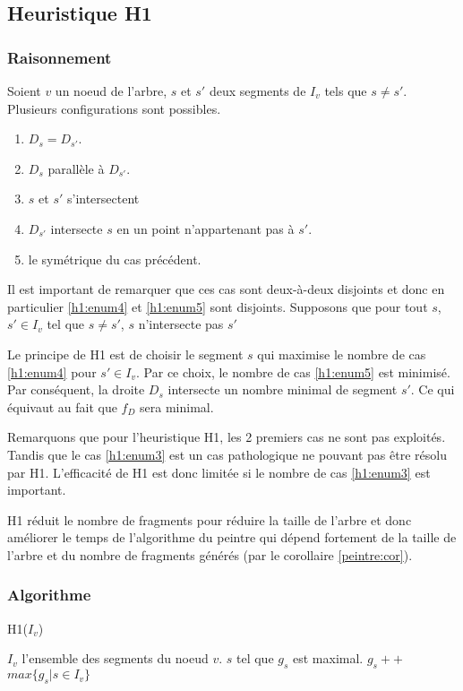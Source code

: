 \subsection{Heuristique H1}
\subsubsection*{Raisonnement}
Soient $v$ un noeud de l'arbre, $s$ et $s'$ deux segments
de $I_v$ tels que $s \ne s'$.
Plusieurs configurations sont possibles.
\begin{enumerate}
\item  $D_s = D_{s'} $. \label{h1:enum1}
\item $D_s$ parallèle à $D_{s'} $. \label{h1:enum2}
\item $s$ et $s'$ s'intersectent \label{h1:enum3}
\item $D_{s'}$ intersecte $s$ en un point n'appartenant pas à $s'$.\label{h1:enum4}
\item le symétrique du cas précédent. \label{h1:enum5}
\end{enumerate}

Il est important de remarquer que ces cas sont deux-à-deux disjoints
et donc en particulier \ref{h1:enum4} et \ref{h1:enum5} sont disjoints.
Supposons que pour tout $s$, $s' \in I_v $ tel que $s \neq s'$,
$s$ n'intersecte pas $s'$

Le principe de H1 est de choisir le segment $s$ qui maximise
le nombre de cas \ref{h1:enum4} pour $s' \in I_v$.
Par ce choix, le nombre de cas \ref{h1:enum5} est minimisé.
Par conséquent, la droite $D_s$ intersecte un nombre minimal de segment $s'$.
Ce qui équivaut au fait que $f_D$ sera minimal.


Remarquons que pour l'heuristique H1, les 2 premiers cas ne sont pas exploités.
Tandis que le cas \ref{h1:enum3} est un cas pathologique ne pouvant pas
être résolu par H1.
L'efficacité de H1 est donc limitée si le nombre de cas
\ref{h1:enum3} est important.

H1 réduit le nombre de fragments pour réduire la taille de l'arbre
et donc améliorer le temps de l'algorithme du peintre qui dépend
fortement de la taille de l'arbre et du nombre de fragments générés (par
le corollaire \ref{peintre:cor}).

\subsubsection*{Algorithme}
\begin{algorithm}
  \caption{H1($I_v$)}
  \begin{algorithmic}[1] \label{algo:propvis}
    \REQUIRE $I_v$ l'ensemble des segments du noeud $v$.
    \ENSURE $s$ tel que $g_s$ est maximal.
    \STATE $g_s++$
    \ENDIF
    \ENDFOR
    \ENDFOR
    \RETURN $max\{g_s|s\in I_v\}$
  \end{algorithmic}
\end{algorithm}
